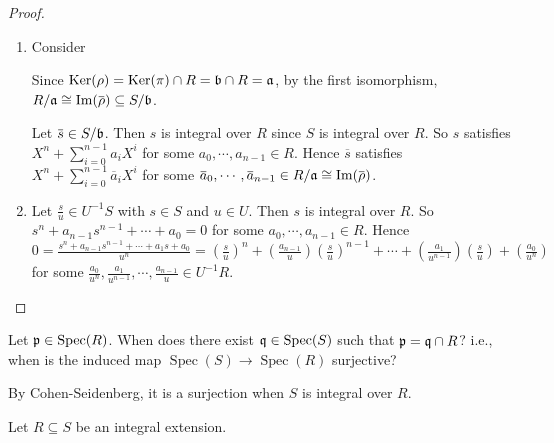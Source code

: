 \begin{proof}
    \begin{enumerate}
        \item Consider
            \begin{center}
            \end{center}
            Since $\operatorname{Ker}(\rho) = \operatorname{Ker}(\pi) \cap R = \mathfrak{b} \cap R = \mathfrak{a}$, by the first isomorphism, $R/\ffa \cong \im(\overbar{\rho}) \subseteq S/\ffb$. \par 
            Let $\overbar{s} \in S/\ffb$. Then $s$ is integral over $R$ since $S$ is integral over $R$. So $s$ satisfies $X^{n} + \sum_{i=0}^{n-1}a_iX^{i}$ for some $a_0,\cdots,a_{n-1} \in R$. Hence $\overbar{s}$ satisfies $X^{n} + \sum_{i=0}^{n-1} \overbar{a}_iX^{i}$ for some $\overbar{a}_0,\cdots,\overbar{a}_{n-1} \in R/\ffa \cong \im(\overbar{\rho})$.
        \item Let $\frac{s}{u} \in U^{-1}S$ with $s \in S$ and $u \in U$. Then $s$ is integral over $R$. So $s^{n} + a_{n-1}s^{n-1} + \cdots + a_0 = 0$ for some $a_0,\cdots,a_{n-1} \in R$. Hence $0 = \frac{s^{n}+a_{n-1}s^{n-1} + \cdots + a_1s + a_0}{u^{n}} = (\frac{s}{u})^{n} + (\frac{a_{n-1}}{u})(\frac{s}{u})^{n-1} + \cdots + (\frac{a_1}{u^{n-1}})(\frac{s}{u}) + (\frac{a_0}{u^{n}})$ for some $\frac{a_0}{u^{n}},\frac{a_1}{u^{n-1}},\cdots,\frac{a_{n-1}}{u} \in U^{-1}R$. \qedhere
    \end{enumerate}
\end{proof}

\begin{discussion}
    Let $\mathfrak{p} \in \operatorname{Spec}(R)$. When does there exist $\mathfrak{q} \in \operatorname{Spec}(S)$ such that $\mathfrak{p} = \mathfrak{q} \cap R$? i.e., when is the induced map $\operatorname{Spec}(S) \to \operatorname{Spec}(R)$ surjective? \par 
    By Cohen-Seidenberg, it is a surjection when $S$ is integral over $R$.
\end{discussion}

\noindent Let $R \subseteq S$ be an integral extension.

